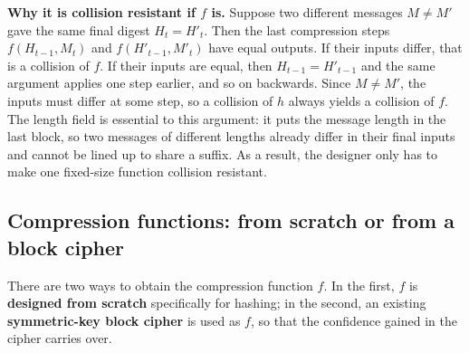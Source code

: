 \textbf{Why it is collision resistant if $f$ is.} Suppose two different messages $M \ne M'$ gave the same final digest $H_t = H'_t$. Then the last compression steps $f(H_{t-1}, M_t)$ and $f(H'_{t-1}, M'_t)$ have equal outputs. If their inputs differ, that is a collision of $f$. If their inputs are equal, then $H_{t-1} = H'_{t-1}$ and the same argument applies one step earlier, and so on backwards. Since $M \ne M'$, the inputs must differ at some step, so a collision of $h$ always yields a collision of $f$. The length field is essential to this argument: it puts the message length in the last block, so two messages of different lengths already differ in their final inputs and cannot be lined up to share a suffix. As a result, the designer only has to make one fixed-size function collision resistant.

\subsection{Compression functions: from scratch or from a block cipher \new}

There are two ways to obtain the compression function $f$. In the first, $f$ is \textbf{designed from scratch} specifically for hashing; in the second, an existing \textbf{symmetric-key block cipher} is used as $f$, so that the confidence gained in the cipher carries over.

